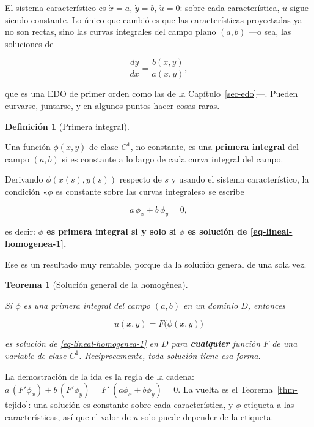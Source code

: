 \documentclass[
  spanish,
  a4paper,
]{scrbook}
\theoremstyle{definition}
\newtheorem{definition}{Definición}[chapter]
\theoremstyle{plain}
\theoremstyle{definition}
\theoremstyle{plain}
\newtheorem{theorem}{Teorema}[chapter]
\theoremstyle{definition}
\theoremstyle{remark}
\begin{document}
El sistema característico es \(\dot x = a\), \(\dot y = b\),
\(\dot u = 0\): sobre cada característica, \(u\) sigue siendo constante.
Lo único que cambió es que las características proyectadas ya no son
rectas, sino las curvas integrales del campo plano \((a,b)\) ---o sea,
las soluciones de

\[
\frac{dy}{dx} = \frac{b(x,y)}{a(x,y)} ,
\]

que es una EDO de primer orden como las de la Capítulo~\ref{sec-edo}---.
Pueden curvarse, juntarse, y en algunos puntos hacer cosas raras.

\begin{definition}[Primera
integral]\protect\hypertarget{def-primera-integral}{}\label{def-primera-integral}

Una función \(\phi(x,y)\) de clase \(C^1\), no constante, es una
\textbf{primera integral} del campo \((a,b)\) si es constante a lo largo
de cada curva integral del campo.

Derivando \(\phi(x(s),y(s))\) respecto de \(s\) y usando el sistema
característico, la condición «\(\phi\) es constante sobre las curvas
integrales» se escribe

\[
a\,\phi_x + b\,\phi_y = 0 ,
\]

es decir: \textbf{\(\phi\) es primera integral si y solo si \(\phi\) es
solución de \ref{eq-lineal-homogenea-1}.}

\end{definition}

Ese es un resultado muy rentable, porque da la solución general de una
sola vez.

\begin{theorem}[Solución general de la
homogénea]\protect\hypertarget{thm-general-homogenea}{}\label{thm-general-homogenea}

Si \(\phi\) es una primera integral del campo \((a,b)\) en un dominio
\(D\), entonces

\[
u(x,y) = F\big(\phi(x,y)\big)
\]

es solución de \ref{eq-lineal-homogenea-1} en \(D\) para
\textbf{cualquier} función \(F\) de una variable de clase \(C^1\).
Recíprocamente, toda solución tiene esa forma.

\end{theorem}

La demostración de la ida es la regla de la cadena:
\(a\,(F'\phi_x) + b\,(F'\phi_y) = F'\,(a\phi_x + b\phi_y) = 0\). La
vuelta es el Teorema~\ref{thm-tejido}: una solución es constante sobre
cada característica, y \(\phi\) etiqueta a las características, así que
el valor de \(u\) solo puede depender de la etiqueta.
\end{document}
